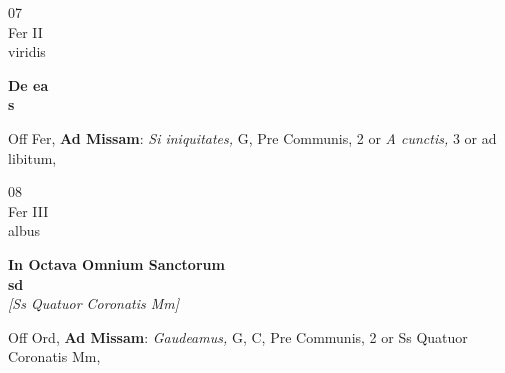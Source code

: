 \documentclass[10pt, openany]{book}
\begin{document}
        \begin{center}
            \begin{minipage}{3.5in}
                \vspace{2em}
                \begin{minipage}{0.5in}
                    {\Huge 07} \\
                    {\normalsize Fer II} \\
                    {\normalsize viridis}
                \end{minipage}
                \begin{minipage}{3.0in}
                    \textbf{ \large De ea \\
                    \textnormal{\normalsize s}} \\ 
                \end{minipage}
                \begin{justify}Off Fer, \textbf{Ad Missam}: \textit{Si iniquitates,} G, Pre Communis, 2 or \textit{A cunctis,} 3 or ad libitum,  
                \end{justify}
            \end{minipage}
        \end{center}
    
        \begin{center}
            \begin{minipage}{3.5in}
                \vspace{2em}
                \begin{minipage}{0.5in}
                    {\Huge 08} \\
                    {\normalsize Fer III} \\
                    {\normalsize albus}
                \end{minipage}
                \begin{minipage}{3.0in}
                    \textbf{ \large In Octava Omnium Sanctorum \\
                    \textnormal{\normalsize sd}} \\ \textit{[Ss Quatuor Coronatis Mm]} \\ 
                \end{minipage}
                \begin{justify}Off Ord, \textbf{Ad Missam}: \textit{Gaudeamus,} G, C, Pre Communis, 2 or Ss Quatuor Coronatis Mm,  
                \end{justify}
            \end{minipage}
        \end{center}
    
\end{document}
